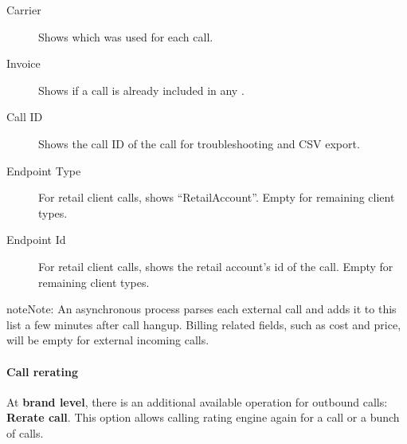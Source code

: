 \documentclass[letterpaper,10pt,english]{sphinxmanual}
\begin{document}
\begin{description}
\item[{Carrier}] \leavevmode{}\label{administration_portal/client/wholesale/calls/external_calls:term-carrier}
Shows which {\hyperref[administration_portal/brand/providers/carriers:carriers]{}} was used for
each call.

\item[{Invoice}] \leavevmode{}\label{administration_portal/client/wholesale/calls/external_calls:term-invoice}
Shows if a call is already included in any {\hyperref[administration_portal/brand/invoicing/invoices:invoices]{}}.

\item[{Call ID}] \leavevmode{}\label{administration_portal/client/wholesale/calls/external_calls:term-call-id}
Shows the call ID of the call for troubleshooting and CSV export.

\item[{Endpoint Type}] \leavevmode{}\label{administration_portal/client/wholesale/calls/external_calls:term-endpoint-type}
For retail client calls, shows ``RetailAccount''. Empty for remaining client types.

\item[{Endpoint Id}] \leavevmode{}\label{administration_portal/client/wholesale/calls/external_calls:term-endpoint-id}
For retail client calls, shows the retail account's id of the call. Empty for remaining client types.

\end{description}

\begin{notice}{note}{Note:}
An asynchronous process parses each external call and adds it to this list a few minutes after call hangup. Billing related fields, such as cost and price, will be empty for external incoming calls.
\end{notice}


\paragraph{Call rerating}
\label{administration_portal/client/wholesale/calls/external_calls:call-rerating}
At \textbf{brand level}, there is an additional available operation for outbound calls: \textbf{Rerate call}. This option allows calling rating engine again for a call or a bunch of calls.
\end{document}
